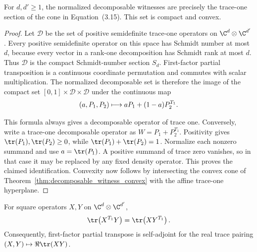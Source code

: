 \begin{theorem}
    \label{thm:normalized_decomposable_witness_compact_convex}
    \leanok
    For $d,d'\geq1$, the normalized decomposable witnesses are precisely the
    trace-one section of the cone in Equation~(3.15).  This set is compact
    and convex.
\end{theorem}

\begin{proof}
    \leanok
    Let $\mathcal D$ be the set of positive semidefinite trace-one operators
    on $\C^d\otimes\C^{d'}$.  Every positive semidefinite operator on this
    space has Schmidt number at most $d$, because every vector in a
    rank-one decomposition has Schmidt rank at most $d$.  Thus $\mathcal D$
    is the compact Schmidt-number section $S_d$.  First-factor partial
    transposition is a continuous coordinate permutation and commutes with
    scalar multiplication.  The normalized decomposable set is therefore
    the image of the compact set
    $[0,1]\times\mathcal D\times\mathcal D$ under the continuous map
    \begin{align}
        (a,P_1,P_2)\longmapsto aP_1+(1-a)P_2^{T_1}.
        \notag
    \end{align}

    This formula always gives a decomposable operator of trace one.
    Conversely, write a trace-one decomposable operator as
    $W=P_1+P_2^{T_1}$.  Positivity gives
    $\tr(P_1),\tr(P_2)\geq0$, while
    $\tr(P_1)+\tr(P_2)=1$.  Normalize each nonzero summand and use
    $a=\tr(P_1)$.  A positive summand of trace zero vanishes, so in that case
    it may be replaced by any fixed density operator.  This proves the
    claimed identification.  Convexity now follows by intersecting the
    convex cone of Theorem~\ref{thm:decomposable_witness_convex} with the
    affine trace-one hyperplane.
\end{proof}

\begin{lemma}
    \label{lem:partial_transpose_left_trace_adjoint}
    \leanok
    For square operators $X,Y$ on $\C^d\otimes\C^{d'}$,
    \begin{align}
        \tr\!\left(X^{T_1}Y\right)
        =\tr\!\left(XY^{T_1}\right).
        \notag
    \end{align}
    Consequently, first-factor partial transpose is self-adjoint for the
    real trace pairing $(X,Y)\mapsto\Re\tr(XY)$.
\end{lemma}

